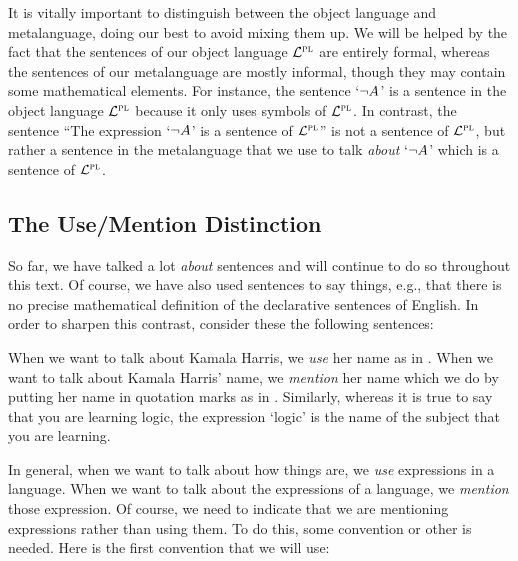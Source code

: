 It is vitally important to distinguish between the object language and metalanguage, doing our best to avoid mixing them up.
We will be helped by the fact that the sentences of our object language $\mathcal{L}^{\textsc{pl}}$ are entirely formal, whereas the sentences of our metalanguage are mostly informal, though they may contain some mathematical elements.
For instance, the sentence `$\neg A$' is a sentence in the object language $\mathcal{L}^{\textsc{pl}}$ because it only uses symbols of $\mathcal{L}^{\textsc{pl}}$. 
In contrast, the sentence ``The expression `$\neg A$' is a sentence of $\mathcal{L}^{\textsc{pl}}$'' is not a sentence of $\mathcal{L}^{\textsc{pl}}$, but rather a sentence in the metalanguage that we use to talk \emph{about} `$\neg A$' which is a sentence of $\mathcal{L}^{\textsc{pl}}$.






\subsection{The Use/Mention Distinction}
  \label{sub.use-mention}

So far, we have talked a lot \textit{about} sentences and will continue to do so throughout this text.
Of course, we have also used sentences to say things, e.g., that there is no precise mathematical definition of the declarative sentences of English.
In order to sharpen this contrast, consider these the following sentences:

\begin{earg} \label{kamala}
\end{earg}

When we want to talk about Kamala Harris, we \textit{use} her name as in .
When we want to talk about Kamala Harris' name, we \textit{mention} her name which we do by putting her name in quotation marks as in .
Similarly, whereas it is true to say that you are learning logic, the expression `logic' is the name of the subject that you are learning. 

In general, when we want to talk about how things are, we \textit{use} expressions in a language.
When we want to talk about the expressions of a language, we \textit{mention} those expression.
Of course, we need to indicate that we are mentioning expressions rather than using them.
To do this, some convention or other is needed.
Here is the first convention that we will use:


